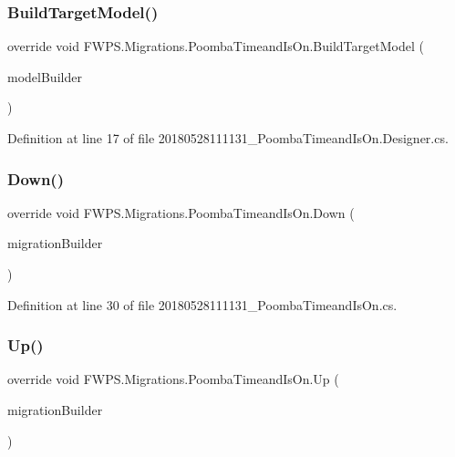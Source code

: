 \subsubsection{\texorpdfstring{Build\+Target\+Model()}{BuildTargetModel()}}
{\footnotesize\ttfamily override void F\+W\+P\+S.\+Migrations.\+Poomba\+Timeand\+Is\+On.\+Build\+Target\+Model (\begin{DoxyParamCaption}\item[{Model\+Builder}]{model\+Builder }\end{DoxyParamCaption})\hspace{0.3cm}{\ttfamily [protected]}}



Definition at line 17 of file 20180528111131\+\_\+\+Poomba\+Timeand\+Is\+On.\+Designer.\+cs.

\mbox{\label{class_f_w_p_s_1_1_migrations_1_1_poomba_timeand_is_on_a372703eaec18df3562f5455783e65e0c}} 
\subsubsection{\texorpdfstring{Down()}{Down()}}
{\footnotesize\ttfamily override void F\+W\+P\+S.\+Migrations.\+Poomba\+Timeand\+Is\+On.\+Down (\begin{DoxyParamCaption}\item[{Migration\+Builder}]{migration\+Builder }\end{DoxyParamCaption})\hspace{0.3cm}{\ttfamily [protected]}}



Definition at line 30 of file 20180528111131\+\_\+\+Poomba\+Timeand\+Is\+On.\+cs.

\mbox{\label{class_f_w_p_s_1_1_migrations_1_1_poomba_timeand_is_on_a2573613449d7d732ad40a5cbce58ac39}} 
\subsubsection{\texorpdfstring{Up()}{Up()}}
{\footnotesize\ttfamily override void F\+W\+P\+S.\+Migrations.\+Poomba\+Timeand\+Is\+On.\+Up (\begin{DoxyParamCaption}\item[{Migration\+Builder}]{migration\+Builder }\end{DoxyParamCaption})\hspace{0.3cm}{\ttfamily [protected]}}



